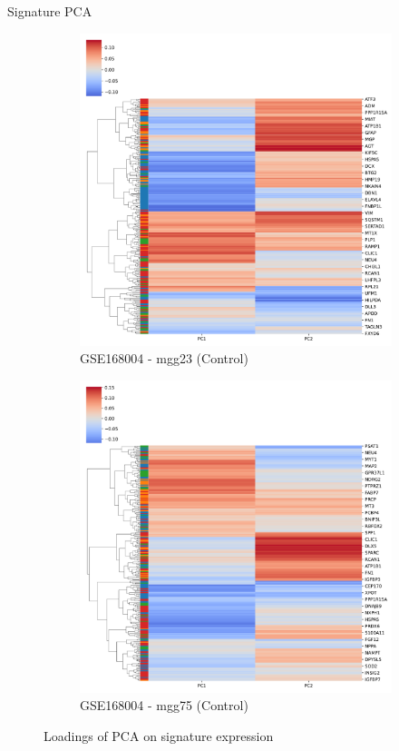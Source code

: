 \documentclass[aspectratio=169,9pt]{beamer}
\begin{document}
\begin{frame}{Signature PCA}
\begin{adjustwidth}{-5cm}{-5cm}
\begin{figure}
\begin{subfigure}[b]{0.38\textwidth}
                    \includegraphics[width=\textwidth]{mgg23_loadings_plot}
                    \caption{GSE168004 - mgg23 (Control)}
                \end{subfigure}
                \begin{subfigure}[b]{0.38\textwidth}
                    \centering
                    \includegraphics[width=\textwidth]{mgg75_loadings_plot}
                    \caption{GSE168004 - mgg75 (Control)}
                \end{subfigure}
                \caption{Loadings of PCA on signature expression}
            \end{figure}
        \end{adjustwidth}
    \end{frame}
\end{document}

